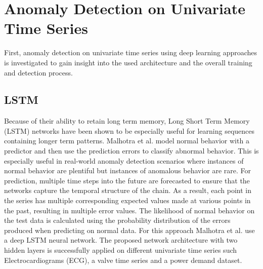 %
%
%
%

\section{Anomaly Detection on Univariate Time Series}

First, anomaly detection on univariate time series using deep learning approaches is investigated to gain insight into the used architecture and the overall training and detection process. 

\subsection{LSTM}

Because of their ability to retain long term memory, Long Short Term Memory (LSTM) networks have been shown to be especially useful for learning sequences containing longer term patterns. Malhotra et al. \parencite*{Malhotra2015} model normal behavior with a predictor and then use the prediction errors to classify abnormal behavior. This is especially useful in real-world anomaly detection scenarios where instances of normal behavior are plentiful but instances of anomalous behavior are rare. For prediction, multiple time steps into the future are forecasted to ensure that the networks capture the temporal structure of the chain. As a result, each point in the series has multiple corresponding expected values made at various points in the past, resulting in multiple error values. The likelihood of normal behavior on the test data is calculated using the probability distribution of the errors produced when predicting on normal data. For this approach Malhotra et al. use a deep LSTM neural network. The proposed network architecture with two hidden layers is successfully applied on different univariate time series such Electrocardiograms (ECG), a valve time series and a power demand dataset. 


